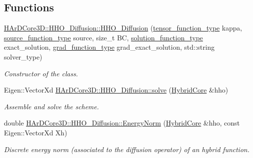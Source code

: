 \subsection*{Functions}
\begin{DoxyCompactItemize}
\item 
\hyperlink{group__HHO__Diffusion_gab9aebbde87e22073a94a57e26f58a860}{H\+Ar\+D\+Core3\+D\+::\+H\+H\+O\+\_\+\+Diffusion\+::\+H\+H\+O\+\_\+\+Diffusion} (\hyperlink{classHArDCore3D_1_1HHO__Diffusion_a6792ca91d753720b28f458bdb3cedcd0}{tensor\+\_\+function\+\_\+type} kappa, \hyperlink{classHArDCore3D_1_1HHO__Diffusion_a868fb4b88efbf1b77a712706d616b8d1}{source\+\_\+function\+\_\+type} source, size\+\_\+t BC, \hyperlink{classHArDCore3D_1_1HHO__Diffusion_a1fa6e03a7ffd6cb0c8a38b34eda2bd27}{solution\+\_\+function\+\_\+type} exact\+\_\+solution, \hyperlink{classHArDCore3D_1_1HHO__Diffusion_afd0b6d7ab35bca58a5f7ec29afbba355}{grad\+\_\+function\+\_\+type} grad\+\_\+exact\+\_\+solution, std\+::string solver\+\_\+type)
\begin{DoxyCompactList}\small\item\em Constructor of the class. \end{DoxyCompactList}\item 
\mbox{\label{group__HHO__Diffusion_gac2ab416e340edc055d1494f5dbe9acce}} 
Eigen\+::\+Vector\+Xd \hyperlink{group__HHO__Diffusion_gac2ab416e340edc055d1494f5dbe9acce}{H\+Ar\+D\+Core3\+D\+::\+H\+H\+O\+\_\+\+Diffusion\+::solve} (\hyperlink{classHArDCore3D_1_1HybridCore}{Hybrid\+Core} \&hho)
\begin{DoxyCompactList}\small\item\em Assemble and solve the scheme. \end{DoxyCompactList}\item 
\mbox{\label{group__HHO__Diffusion_ga65f1cf98696c042edefb2f35d298b971}} 
double \hyperlink{group__HHO__Diffusion_ga65f1cf98696c042edefb2f35d298b971}{H\+Ar\+D\+Core3\+D\+::\+H\+H\+O\+\_\+\+Diffusion\+::\+Energy\+Norm} (\hyperlink{classHArDCore3D_1_1HybridCore}{Hybrid\+Core} \&hho, const Eigen\+::\+Vector\+Xd Xh)
\begin{DoxyCompactList}\small\item\em Discrete energy norm (associated to the diffusion operator) of an hybrid function. \end{DoxyCompactList}\item 
\mbox{\label{group__HHO__Diffusion_gaa2bb4d069026f1604d2899031d3642f1}} 

\end{DoxyCompactItemize}
